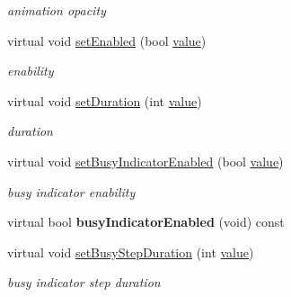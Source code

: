 \begin{DoxyCompactItemize}
\begin{DoxyCompactList}\small\item\em animation opacity \end{DoxyCompactList}\item 
\mbox{\label{class_progress_bar_engine_abeff5de2c4c512e37cab312ea3e01d50}} 
virtual void \hyperlink{class_progress_bar_engine_abeff5de2c4c512e37cab312ea3e01d50}{set\+Enabled} (bool \hyperlink{class_progress_bar_engine_aa36692894c1728c6aa6e06d93803e5df}{value})
\begin{DoxyCompactList}\small\item\em enability \end{DoxyCompactList}\item 
\mbox{\label{class_progress_bar_engine_a1a20847357376db2b6560aef977f4003}} 
virtual void \hyperlink{class_progress_bar_engine_a1a20847357376db2b6560aef977f4003}{set\+Duration} (int \hyperlink{class_progress_bar_engine_aa36692894c1728c6aa6e06d93803e5df}{value})
\begin{DoxyCompactList}\small\item\em duration \end{DoxyCompactList}\item 
\mbox{\label{class_progress_bar_engine_aafbff9f2508f460b114e9881265a0215}} 
virtual void \hyperlink{class_progress_bar_engine_aafbff9f2508f460b114e9881265a0215}{set\+Busy\+Indicator\+Enabled} (bool \hyperlink{class_progress_bar_engine_aa36692894c1728c6aa6e06d93803e5df}{value})
\begin{DoxyCompactList}\small\item\em busy indicator enability \end{DoxyCompactList}\item 
\mbox{\label{class_progress_bar_engine_aa519c2528e040528e1c3b6cc027e11f4}} 
virtual bool {\bfseries busy\+Indicator\+Enabled} (void) const
\item 
\mbox{\label{class_progress_bar_engine_a3cee0e20be99f5c2e8f9de4ae5f54a34}} 
virtual void \hyperlink{class_progress_bar_engine_a3cee0e20be99f5c2e8f9de4ae5f54a34}{set\+Busy\+Step\+Duration} (int \hyperlink{class_progress_bar_engine_aa36692894c1728c6aa6e06d93803e5df}{value})
\begin{DoxyCompactList}\small\item\em busy indicator step duration \end{DoxyCompactList}\item 

\end{DoxyCompactItemize}
